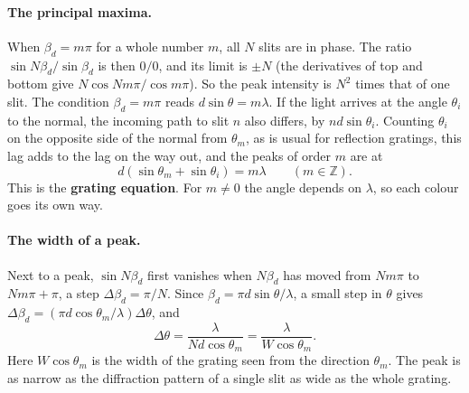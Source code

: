 \paragraph{The principal maxima.} When $\beta_d=m\pi$ for a whole number $m$, all $N$ slits are in phase. The ratio $\sin N\beta_d/\sin\beta_d$ is then $0/0$, and its limit is $\pm N$ (the derivatives of top and bottom give $N\cos Nm\pi/\cos m\pi$). So the peak intensity is $N^2$ times that of one slit. The condition $\beta_d=m\pi$ reads $d\sin\theta=m\lambda$. If the light arrives at the angle $\theta_i$ to the normal, the incoming path to slit $n$ also differs, by $nd\sin\theta_i$. Counting $\theta_i$ on the opposite side of the normal from $\theta_m$, as is usual for reflection gratings, this lag adds to the lag on the way out, and the peaks of order $m$ are at
\begin{equation}
	d\left(\sin\theta_m + \sin\theta_i\right) = m\lambda \qquad (m \in \mathbb{Z}).
	\label{eq:grating_equation}
\end{equation}
This is the \textbf{grating equation}. For $m\ne0$ the angle depends on $\lambda$, so each colour goes its own way.

\paragraph{The width of a peak.} Next to a peak, $\sin N\beta_d$ first vanishes when $N\beta_d$ has moved from $Nm\pi$ to $Nm\pi+\pi$, a step $\Delta\beta_d=\pi/N$. Since $\beta_d=\pi d\sin\theta/\lambda$, a small step in $\theta$ gives $\Delta\beta_d=(\pi d\cos\theta_m/\lambda)\Delta\theta$, and
\begin{equation}
	\Delta\theta = \frac{\lambda}{Nd\cos\theta_m} = \frac{\lambda}{W\cos\theta_m}.
	\label{eq:grating_angular_width}
\end{equation}
Here $W\cos\theta_m$ is the width of the grating seen from the direction $\theta_m$. The peak is as narrow as the diffraction pattern of a single slit as wide as the whole grating.

